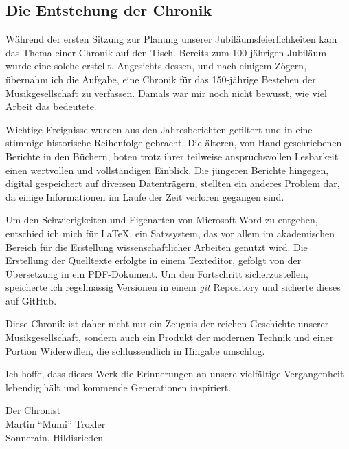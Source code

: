
\cleardoublepage

\begin{multicols*}{2}

    \vphantom{1em}
    \vfill
    \columnbreak

    \section*{Die Entstehung der Chronik}

    Während der ersten Sitzung zur Planung unserer Jubiläumsfeierlichkeiten kam
    das Thema einer Chronik auf den Tisch. Bereits zum 100-jährigen Jubiläum
    wurde eine solche erstellt. Angesichts dessen, und nach einigem Zögern,
    übernahm ich die Aufgabe, eine Chronik für das 150-jährige Bestehen der
    Musikgesellschaft zu verfassen. Damals war mir noch nicht bewusst, wie viel
    Arbeit das bedeutete.

    Wichtige Ereignisse wurden aus den Jahresberichten gefiltert und in eine
    stimmige historische Reihenfolge gebracht. Die älteren, von Hand
    geschriebenen Berichte in den Büchern, boten trotz ihrer teilweise
    anspruchsvollen Lesbarkeit einen wertvollen und vollständigen Einblick. Die
    jüngeren Berichte hingegen, digital gespeichert auf diversen Datenträgern,
    stellten ein anderes Problem dar, da einige Informationen im Laufe der Zeit
    verloren gegangen sind.

    \bigskip

    Um den Schwierigkeiten und Eigenarten von Microsoft Word zu entgehen,
    entschied ich mich für \LaTeX, ein Satzsystem, das vor allem im akademischen
    Bereich für die Erstellung wissenschaftlicher Arbeiten genutzt wird. Die
    Erstellung der Quelltexte erfolgte in einem Texteditor, gefolgt von der
    Übersetzung in ein PDF-Dokument. Um den Fortschritt sicherzustellen,
    speicherte ich regelmässig Versionen in einem \emph{git} Repository und sicherte
    dieses auf GitHub.

    \bigskip

    Diese Chronik ist daher nicht nur ein Zeugnis der reichen Geschichte unserer
    Musikgesellschaft, sondern auch ein Produkt der modernen Technik und einer
    Portion Widerwillen, die schlussendlich in Hingabe umschlug.

    Ich hoffe, dass dieses Werk die Erinnerungen an unsere vielfältige
    Vergangenheit lebendig hält und kommende Generationen inspiriert.

    \bigskip

    \raggedleft Der Chronist\\
    \raggedleft Martin \enquote{Mumi} Troxler\\
    \raggedleft Sonnerain, Hildisrieden\\

\end{multicols*}
